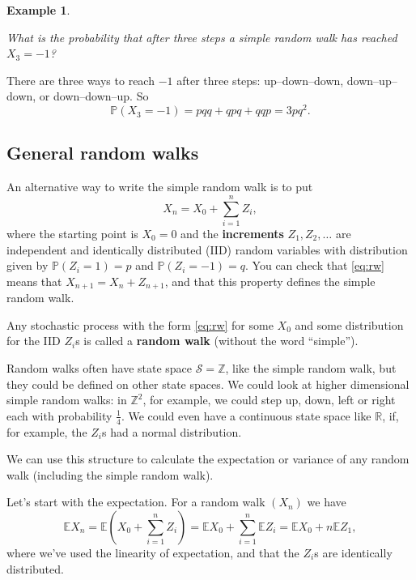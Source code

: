 \documentclass[
  a4paper,
]{article}
\theoremstyle{definition}
\theoremstyle{definition}
\newtheorem{example}{Example}[section]
\theoremstyle{definition}
\theoremstyle{remark}
\begin{document}
\begin{example}
\protect\hypertarget{exm:rw2}{}\label{exm:rw2}

\emph{What is the probability that after three steps a simple random walk has reached \(X_3 = -1\)?}

There are three ways to reach \(-1\) after three steps: up--down--down, down--up--down, or down--down--up. So
\[ \mathbb P(X_3 = -1) = pqq+qpq+qqp = 3pq^2 . \]

\end{example}

\hypertarget{general-random-walks}{%
\subsection{General random walks}\label{general-random-walks}}

An alternative way to write the simple random walk is to put
\begin{equation}
    X_n = X_0 + \sum_{i=1}^n Z_i ,  \label{eq:rw}
  \end{equation}
where the starting point is \(X_0 = 0\) and the \textbf{increments} \(Z_1, Z_2, \dots\) are independent and identically distributed (IID) random variables with distribution given by \(\mathbb P(Z_i = 1) = p\) and \(\mathbb P(Z_i = -1) = q\). You can check that \eqref{eq:rw} means that \(X_{n+1} = X_n + Z_{n+1}\), and that this property defines the simple random walk.

Any stochastic process with the form \eqref{eq:rw} for some \(X_0\) and some distribution for the IID \(Z_i\)s is called a \textbf{random walk} (without the word ``simple'').

Random walks often have state space \(\mathcal S = \mathbb Z\), like the simple random walk, but they could be defined on other state spaces. We could look at higher dimensional simple random walks: in \(\mathbb Z^2\), for example, we could step up, down, left or right each with probability \(\frac14\). We could even have a continuous state space like \(\mathbb R\), if, for example, the \(Z_i\)s had a normal distribution.

We can use this structure to calculate the expectation or variance of any random walk (including the simple random walk).

Let's start with the expectation. For a random walk \((X_n)\) we have
\[ \mathbb E X_n = \mathbb E \left(X_0 + \sum_{i=1}^n Z_i\right) = \mathbb E X_0 + \sum_{i=1}^n \mathbb E Z_i = \mathbb EX_0 + n \mathbb E Z_1 , \]
where we've used the linearity of expectation, and that the \(Z_i\)s are identically distributed.
\end{document}
